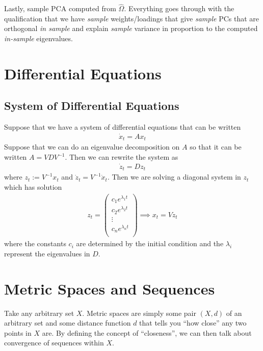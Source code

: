 \documentclass[12pt]{article}
\numberwithin{equation}{section} %
\theoremstyle{plain}
\theoremstyle{definition}
\theoremstyle{remark}
\newcommand{\dx}{\dot{x}}
\newcommand{\dz}{\dot{z}}
\begin{document}
Lastly, sample PCA computed from $\hat{\Omega}$.
Everything goes through with the qualification
that we have \emph{sample} weights/loadings that give \emph{sample} PCs
that are orthogonal \emph{in sample} and explain \emph{sample} variance
in proportion to the computed \emph{in-sample} eigenvalues.



\clearpage
\section{Differential Equations}

\subsection{System of Differential Equations}

Suppose that we have a system of differential equations that can be
written
\begin{align*}
  \dx_t = Ax_t
\end{align*}
Suppose that we can do an eigenvalue decomposition on $A$ so that it can
be written $A = VD V^{-1}$. Then we can rewrite the system as
\begin{align*}
  \dz_t = Dz_t
\end{align*}
where $z_t:= V^{-1}x_t$ and $\dz_t=V^{-1}\dx_t$. Then we are solving a
diagonal system in $z_t$ which has solution
\begin{align*}
  z_t =
  \begin{pmatrix}
    c_1 e^{\lambda_1 t} \\
    c_2 e^{\lambda_2 t} \\
    \vdots \\
    c_n e^{\lambda_n t} \\
  \end{pmatrix}
  \implies
  x_t = V z_t
\end{align*}
where the constants $c_i$ are determined by the initial condition and
the $\lambda_i$ represent the eigenvalues in $D$.




\clearpage
\section{Metric Spaces and Sequences}

Take any arbitrary set $X$. Metric spaces are simply some pair $(X,d)$
of an arbitrary set and some distance function $d$ that tells you ``how
close'' any two points in $X$ are. By defining the concept of
``closeness'', we can then talk about convergence of sequences within
$X$.
\end{document}
